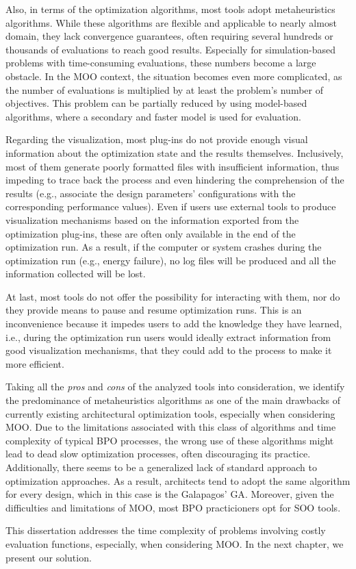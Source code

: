 	Also, in terms of the optimization algorithms, most tools adopt metaheuristics algorithms. While these algorithms are flexible and applicable to nearly almost domain, they lack convergence guarantees, often requiring several hundreds or thousands of evaluations to reach good results. Especially for simulation-based problems with time-consuming evaluations, these numbers become a large obstacle. In the \ac{MOO} context, the situation becomes even more complicated, as the number of evaluations is multiplied by at least the problem's number of objectives. This problem can be partially reduced by using model-based algorithms, where a secondary and faster model is used for evaluation.
	
	Regarding the visualization, most plug-ins do not provide enough visual information about the optimization state and the results themselves. Inclusively, most of them generate poorly formatted files with insufficient information, thus impeding to trace back the process and even hindering the comprehension of the results (e.g., associate the design parameters' configurations with the corresponding performance values). Even if users use external tools to produce visualization mechanisms based on the information exported from the optimization plug-ins, these are often only available in the end of the optimization run. As a result, if the computer or system crashes during the optimization run (e.g., energy failure), no log files will be produced and all the information collected will be lost. 
	
	At last, most tools do not offer the possibility for interacting with them, nor do they provide means to pause and resume optimization runs. This is an inconvenience because it impedes users to add the knowledge they have learned, i.e., during the optimization run users would ideally extract information from good visualization mechanisms, that they could add to the process to make it more efficient.
	
	Taking all the \textit{pros} and \textit{cons} of the analyzed tools into consideration, we identify the predominance of metaheuristics algorithms as one of the main drawbacks of currently existing architectural optimization tools, especially when considering \ac{MOO}. Due to the limitations associated with this class of algorithms and time complexity of typical \ac{BPO} processes, the wrong use of these algorithms might lead to dead slow optimization processes, often discouraging its practice. Additionally, there seems to be a generalized lack of standard approach to optimization approaches. As a result, architects tend to adopt the same algorithm for every design, which in this case is the Galapagos' \ac{GA}. Moreover, given the difficulties and limitations of \ac{MOO}, most \ac{BPO} practicioners opt for \ac{SOO} tools. 
		
	This dissertation addresses the time complexity of problems involving costly evaluation functions, especially, when considering \ac{MOO}. In the next chapter, we present our solution.
		